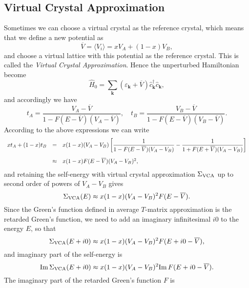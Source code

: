 \documentclass{book}
\newcommand{\average}[1]{\langle#1\rangle}
\renewcommand{\Im}{{\rm Im}}
\numberwithin{equation}{section}
\begin{document}
\subsection*{Virtual Crystal Approximation}
Sometimes we can choose a virtual crystal as the reference crystal,
which means that we define a new potential as
\begin{equation}
  \overline{V}=\average{V_i}=xV_A+(1-x)V_B,
\end{equation}
and choose a virtual lattice with this potential as the reference
crystal. This is called the \textit{Virtual Crystal
  Approximation}. Hence the unperturbed Hamiltonian become
\begin{equation}
  \hat{H}_0=\sum_{\bm{k}}(\varepsilon_{\bm{k}}+\overline{V})
  \hat{c}_{\bm{k}}^\dagger\hat{c}_{\bm{k}},
\end{equation}
and accordingly we have
\begin{equation}
  t_A=\frac{V_A-\overline{V}}{1-F(E-\overline{V})(V_A-\overline{V})},\quad
  t_B=\frac{V_B-\overline{V}}{1-F(E-\overline{V})(V_B-\overline{V})}.
\end{equation}
According to the above expressions we can write
\begin{equation}
  \begin{array}{rcl}
    xt_A+(1-x)t_B&=&\displaystyle x(1-x)(V_A-V_B)\left[\frac{1}{1-F(E-\overline{V})(V_A-V_B)}
      -\frac{1}{1+F(E+\overline{V})(V_A-V_B)}\right]\\\vbox to 18pt{}
    &\approx&x(1-x)F(E-\overline{V})(V_A-V_B)^2,
  \end{array}
\end{equation}
and retaining the self-energy with virtual crystal approximation
$\Sigma_{\rm VCA}$ up to second order of powers of $V_A-V_B$ gives
\begin{equation}
  \Sigma_{\rm VCA}(E)\approx x(1-x)(V_A-V_B)^2F(E-\overline{V}).
\end{equation}
Since the Green's function defined in average $T$-matrix approximation
is the retarded Green's function, we need to add an imaginary
infinitesimal $i0$ to the energy $E$, so that
\begin{equation}
  \Sigma_{\rm VCA}(E+i0)\approx x(1-x)(V_A-V_B)^2 F(E+i0-\overline{V}),
\end{equation}
and imaginary part of the self-energy is
\begin{equation}
  \Im\,\Sigma_{\rm VCA}(E+i0)\approx x(1-x)(V_A-V_B)^2\Im\, F(E+i0-\overline{V}).
\end{equation}
The imaginary part of the retarded Green's function $F$ is
\end{document}

